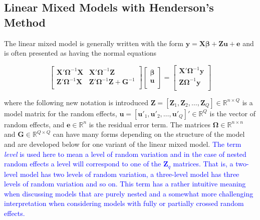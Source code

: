 \documentclass[12pt]{article}
\begin{document}
\subsection*{Linear Mixed Models with Henderson's Method}

The linear mixed model is generally written with the form $\bm{y} = \bm{X}\bm{\beta} + \bm{Z}\bm{u} + \bm{e}$ \cite{laird:ware} and is often presented as having the normal equations \cite{henderson}

\begin{equation}
\label{eqn:henderson:eiv}
\left [ 
\begin{array}{cc}
\bm{X'}\bm{\Omega}^{-1}\bm{X} & \bm{X'}\bm{\Omega}^{-1}\bm{Z}\\
\bm{Z}'\bm{\Omega}^{-1}\bm{X} & \bm{Z}'\bm{\Omega}^{-1}\bm{Z} + \bm{G}^{-1}\\
\end{array}
\right ]
\left [ 
\begin{array}{c}
\bm{\beta}\\
\bm{u}\\
\end{array}
\right ] = 
\left [ 
\begin{array}{c}
\bm{X'}\bm{\Omega}^{-1}\bm{y} \\
\bm{Z}\bm{\Omega}^{-1}\bm{y}\\
\end{array}
\right] 
\end{equation}


\noindent where the following new notation is introduced $\bm{Z} = [\bm{Z}_1, \bm{Z}_2, \ldots, \bm{Z}_Q] \in \mathbb{R}^{n \times Q}$ is a model matrix for the random effects, $\bm{u} = [\bm{u}'_1, \bm{u}'_2, \ldots, \bm{u}'_Q]' \in \mathbb{R}^Q$ is the vector of random effects, and $\bm{e} \in \mathbb{R}^n$ is the residual error term. The matrices $\bm{\Omega} \in \mathbb{R}^{n \times n}$ and $\bm{G} \in \mathbb{R}^{Q \times Q}$ can have many forms depending on the structure of the model and are developed below for one variant of the linear mixed model. \textcolor{blue}{The term \textit{level} is used here to mean a level of random variation and in the case of nested random effects a level will correspond to one of the $\bm{Z}_q$ matrices. That is, a two-level model has two levels of random variation, a three-level model has three levels of random variation and so on. This term has a rather intuitive meaning when discussing models that are purely nested and a somewhat more challenging interpretation when considering models with fully or partially crossed random effects.}
\end{document}

